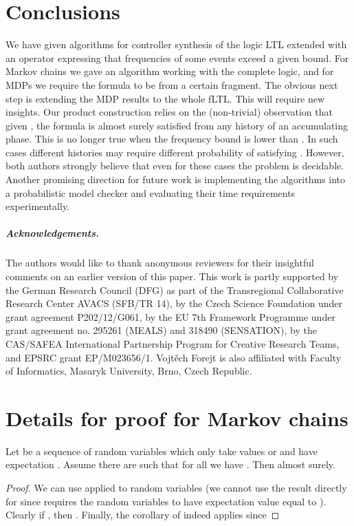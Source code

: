 \documentclass[a4paper,UKenglish]{lipics}
\newcommand{\theoremlike}[2]{\par\medskip\penalty-250\refstepcounter{theorem}{{\bfseries\noindent#2
			\ref{#1}.}}}
\newcommand{\thmhelperpre}[2]{\theoremlike{#1}{#2}}
\newcommand{\thmhelperpost}{\par\medskip}
\newenvironment{reflemma}[1]{\thmhelperpre{#1}{Lemma}}{\thmhelperpost}
\begin{document}
\section{Conclusions}

We have given algorithms for controller synthesis of the logic LTL extended with
an operator expressing that frequencies of some events exceed a given bound.
For Markov chains we gave an algorithm working with the complete logic, and for
MDPs we require the formula to be from a certain fragment.
The obvious next step is extending the MDP results to the whole fLTL.
This will require new insights. Our product construction relies on the (non-trivial) observation
that given , the formula  is almost surely satisfied from
any history of an accumulating phase. This is no longer true when the frequency bound is
lower than . In such cases different histories may require different probability of
satisfying . However, both authors strongly believe that even for these cases the problem
is decidable.
Another promising direction for future work is implementing the algorithms into a probabilistic model checker and evaluating their time requirements experimentally.

\subparagraph{Acknowledgements.} The authors would like to thank anonymous reviewers for their insightful comments on an earlier version of this paper. 
This work is partly supported by the German Research Council (DFG) as part of the Transregional Collaborative Research Center AVACS (SFB/TR 14), by the Czech Science Foundation under grant agreement P202/12/G061, by the EU 7th Framework Programme under grant agreement no. 295261 (MEALS) and 318490 (SENSATION), by the CAS/SAFEA International Partnership Program for Creative Research Teams, and EPSRC grant EP/M023656/1. Vojt\v{e}ch Forejt is also affiliated with Faculty of Informatics, Masaryk University, Brno, Czech Republic.








\onecolumn
\newpage
\appendix
\section{Details for proof for Markov chains}


\begin{reflemma}{lemma:alt-slln}
Let  be a sequence of random variables which only take values  or  and have expectation . Assume there are  such that for all  we have . Then
 almost surely.
\end{reflemma}
\begin{proof}
We can use \cite[Corollary 4]{lyons} applied to random variables  (we cannot use the result directly for  since \cite{lyons} requires the random variables to have expectation value equal to ). Clearly if ,
then
. 
Finally, the corollary of \cite{lyons} indeed applies since

\end{proof}
\end{document}
